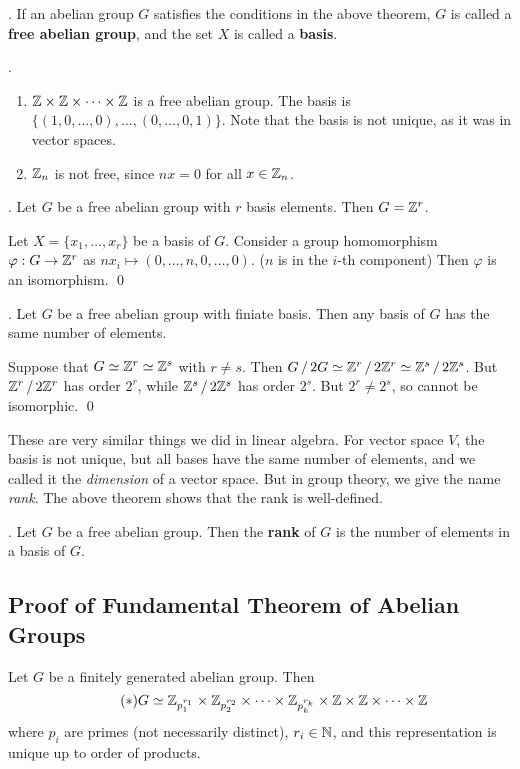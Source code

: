 .  If an abelian group \(G\) satisfies the conditions in the above theorem, \(G\) is called a \textbf{free abelian group}, and the set \(X\) is called a \textbf{basis}.

\ex.
\begin{enumerate}
    \item \(\mathbb{Z} \times \mathbb{Z} \times \cdots \times \mathbb{Z}\) is a free abelian group. The basis is \(\{(1, 0, \dots, 0), \dots, (0, \dots, 0, 1)\}\). Note that the basis is not unique, as it was in vector spaces.
    \item \(\mathbb{Z}_n\) is not free, since \(nx = 0\) for all \(x \in \mathbb{Z}_n\).
\end{enumerate}

\thm. Let \(G\) be a free abelian group with \(r\) basis elements. Then \(G = \mathbb{Z}^r\).

\pf Let \(X = \{x_1, \dots, x_r\}\) be a basis of \(G\). Consider a group homomorphism \(\varphi : G \rightarrow \mathbb{Z}^r\) as \(nx_i \mapsto (0, \dots, n, 0, \dots, 0)\). (\(n\) is in the \(i\)-th component) Then \(\varphi\) is an isomorphism. \qed

\pagebreak

\thm. Let \(G\) be a free abelian group with finiate basis. Then any basis of \(G\) has the same number of elements.

\pf Suppose that \(G \simeq \mathbb{Z}^r \simeq \mathbb{Z}^s\) with \(r\neq s\). Then \(G \operatorname{/} 2G \simeq \mathbb{Z}^r \operatorname{/} 2\mathbb{Z}^r \simeq \mathbb{Z}^s \operatorname{/} 2\mathbb{Z}^s\). But \(\mathbb{Z}^r \operatorname{/} 2\mathbb{Z}^r\) has order \(2^r\), while \(\mathbb{Z}^s \operatorname{/} 2\mathbb{Z}^s\) has order \(2^s\). But \(2^r \neq 2^s\), so cannot be isomorphic. \qed

These are very similar things we did in linear algebra. For vector space \(V\), the basis is not unique, but all bases have the same number of elements, and we called it the \textit{dimension} of a vector space. But in group theory, we give the name \textit{rank}. The above theorem shows that the rank is well-defined.

.  Let \(G\) be a free abelian group. Then the \textbf{rank} of \(G\) is the number of elements in a basis of \(G\).

\subsection*{Proof of Fundamental Theorem of Abelian Groups}

\recall Let \(G\) be a finitely generated abelian group. Then
\[ \tag{\mast}
    G \simeq \Z_{p_1^{r_1}} \times \Z_{p_2^{r_2}} \times \cdots \times \Z_{p_k^{r_k}} \times \Z \times \Z \times \cdots \times \Z
\]
where \(p_i\) are primes (not necessarily distinct), \(r_i \in \mathbb{N}\), and this representation is unique up to order of products.


